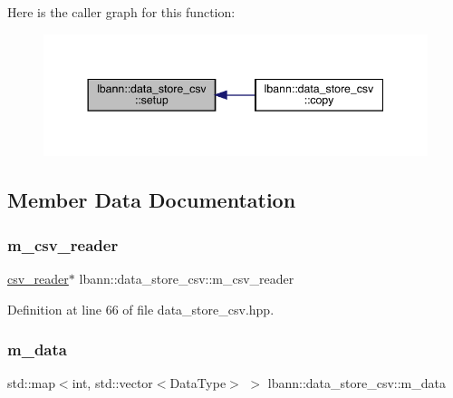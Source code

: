 Here is the caller graph for this function\+:\nopagebreak
\begin{figure}[H]
\begin{center}
\leavevmode
\includegraphics[width=344pt]{classlbann_1_1data__store__csv_a184c7e6f27c5e07255b9c889ace02407_icgraph}
\end{center}
\end{figure}


\subsection{Member Data Documentation}
\mbox{\label{classlbann_1_1data__store__csv_a8920e09beb3e40e59e2858daf95a6cf9}} 
\subsubsection{\texorpdfstring{m\+\_\+csv\+\_\+reader}{m\_csv\_reader}}
{\footnotesize\ttfamily \hyperlink{classlbann_1_1csv__reader}{csv\+\_\+reader}$\ast$ lbann\+::data\+\_\+store\+\_\+csv\+::m\+\_\+csv\+\_\+reader\hspace{0.3cm}{\ttfamily [protected]}}



Definition at line 66 of file data\+\_\+store\+\_\+csv.\+hpp.

\mbox{\label{classlbann_1_1data__store__csv_a8f0ac398b2ed53c36594ca1baaf4bde0}} 
\subsubsection{\texorpdfstring{m\+\_\+data}{m\_data}}
{\footnotesize\ttfamily std\+::map$<$int, std\+::vector$<$Data\+Type$>$ $>$ lbann\+::data\+\_\+store\+\_\+csv\+::m\+\_\+data\hspace{0.3cm}{\ttfamily [protected]}}

